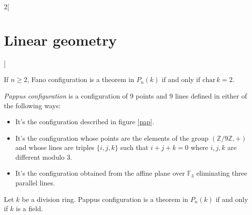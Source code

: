 \documentclass[../../../main.tex]{subfiles}
\begin{document}
\begin{multicols}{2}[\section{Linear geometry}]
\begin{definition}
\end{definition}
\begin{theorem}
If $n\geq 2$, Fano configuration is a theorem in $P_n(k)$ if and only if $\text{char}\,k=2$.
\end{theorem}
\begin{definition}
\textit{Pappus configuration} is a configuration of 9 points and 9 lines defined in either of the following ways:
\begin{itemize}
    \item It's the configuration described in figure \ref{pap}.
    \item It's the configuration whose points are the elements of the group $(\mathbb{Z}/9\mathbb{Z},+)$ and whose lines are triples $\{i,j,k\}$ such that $i+j+k=0$ where $i,j,k$ are different modulo 3.
    \item It's the configuration obtained from the affine plane over $\mathbb{F}_3$ eliminating three parallel lines.
\end{itemize}
\end{definition}
\begin{theorem}
Let $k$ be a division ring. Pappus configuration is a theorem in $P_n(k)$ if and only if $k$ is a field.
\end{theorem}

\end{multicols}
\end{document}
